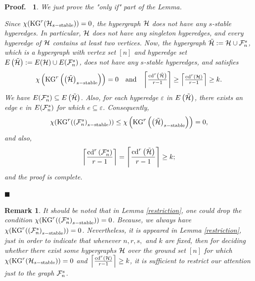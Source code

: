 \documentclass[11pt]{article}
\newtheorem{preproof}{{\bf Proof.\ }}
\newenvironment{proof}[1]{\begin{preproof}{\rm
               #1}\hfill{$\blacksquare$}}{\end{preproof}}
\newtheorem{prerem}{{\bf Remark}}
\newenvironment{rem}{\begin{prerem}{\hspace{-0.5
               em}{\bf.\ }}}{\end{prerem}}
\begin{document}
\begin{proof}{
		We just prove the "only if" part of the Lemma.
		
		\noindent Since $\chi ({\rm KG}^r ({\cal H}_{s-{\rm stable}}))=0$,
		the hypergraph ${\cal H}$ does not have any $s$-stable hyperedges. In particular,
		${\cal H}$ does not have any singleton hyperedges, and every hyperedge of ${\cal H}$
		contains at least two vertices. Now, the hypergraph
		$\tilde{{\cal H}} := {\cal H} \cup {\cal F}_{n}^{s}$, which is a hypergraph with vertex set $[n]$ and hyperedge set
		$E \left(  \tilde{{\cal H}}   \right)  :=   E({\cal H})  \cup  E({\cal F}_{n}^{s})$, does not have any $s$-stable hyperedges, and satisfies
		$$\begin{array}[1]{ccc}
			\chi \left({\rm KG}^r \left( \left(  \tilde{{\cal H}}   \right)_{s-{\rm stable}}\right)\right)=0  &  {\rm and}   &
			\left\lceil  \frac{{\rm cd}^r \left(  \tilde{{\cal H}}   \right)}{r-1}   \right\rceil  \geq \left\lceil  \frac{{\rm cd}^r \left(  {\cal H}   \right)}{r-1}   \right\rceil  \geq k.
		\end{array}  $$
		We have $E({\cal F}_{n}^{s})  \subseteq E \left(  \tilde{{\cal H}}   \right) $. Also,
		for each hyperedge $\varepsilon$ in $E \left(  \tilde{{\cal H}}   \right)$, there exists an
		edge $e$ in $E({\cal F}_{n}^{s})$ for which $e \subseteq \varepsilon$.
		Consequently,
		$$\chi ({\rm KG}^r (\left({\cal F}_{n}^{s}\right)_{s-{\rm stable}}))
		\leq
		\chi \left({\rm KG}^r \left( \left(  \tilde{{\cal H}}   \right)_{s-{\rm stable}}\right)\right)=0,$$
		and also,
		$$\left\lceil  \frac{{\rm cd}^r \left({\cal F}_{n}^{s}\right)}{r-1}   \right\rceil
		=
		\left\lceil  \frac{{\rm cd}^r \left(  \tilde{{\cal H}}   \right)}{r-1}   \right\rceil  \geq k;
		$$
		and the proof is complete.
	}
\end{proof}

\begin{rem}
	It should be noted that in Lemma \ref{restriction}, one could drop the condition $\chi ({\rm KG}^r (\left({\cal F}_{n}^{s}\right)_{s-{\rm stable}})) = 0$. Because, we always have
	$\chi ({\rm KG}^r (\left({\cal F}_{n}^{s}\right)_{s-{\rm stable}}))=0$. Nevertheless, it is appeared in Lemma \ref{restriction}, just in order to indicate that whenever $n, r, s,$ and $k$ are fixed, then for deciding whether there exist some hypergraphs ${\cal H}$ over the ground set $[n]$ for which $\chi ({\rm KG}^r ({\cal H}_{s-{\rm stable}}))=0$ and $\left\lceil  \frac{{\rm cd}^r ({\cal H})}{r-1}   \right\rceil  \geq k$, it is sufficient to restrict our attention just to the graph ${\cal F}_{n}^{s}$.
\end{rem}
\end{document}

